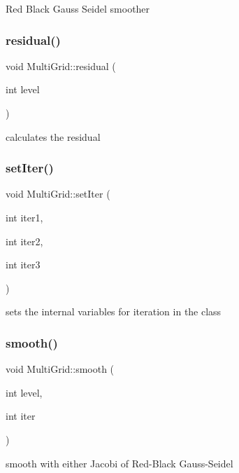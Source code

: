 Red Black Gauss Seidel smoother \mbox{\label{classMultiGrid_a605e0a32f5f979b781b4a4b70c9c90f2}} 
\subsubsection{\texorpdfstring{residual()}{residual()}}
{\footnotesize\ttfamily void Multi\+Grid\+::residual (\begin{DoxyParamCaption}\item[{int}]{level }\end{DoxyParamCaption})}

calculates the residual \mbox{\label{classMultiGrid_a5d3162dc383c2031dbd52395fb12edaf}} 
\subsubsection{\texorpdfstring{set\+Iter()}{setIter()}}
{\footnotesize\ttfamily void Multi\+Grid\+::set\+Iter (\begin{DoxyParamCaption}\item[{int}]{iter1,  }\item[{int}]{iter2,  }\item[{int}]{iter3 }\end{DoxyParamCaption})}

sets the internal variables for iteration in the class \mbox{\label{classMultiGrid_afc18e9c07fe4359bcdb5d7999ef9672b}} 
\subsubsection{\texorpdfstring{smooth()}{smooth()}}
{\footnotesize\ttfamily void Multi\+Grid\+::smooth (\begin{DoxyParamCaption}\item[{int}]{level,  }\item[{int}]{iter }\end{DoxyParamCaption})}

smooth with either Jacobi of Red-\/\+Black Gauss-\/\+Seidel \mbox{\label{classMultiGrid_a679ace3c3a59b2c7e93708f6db0b237c}} 
